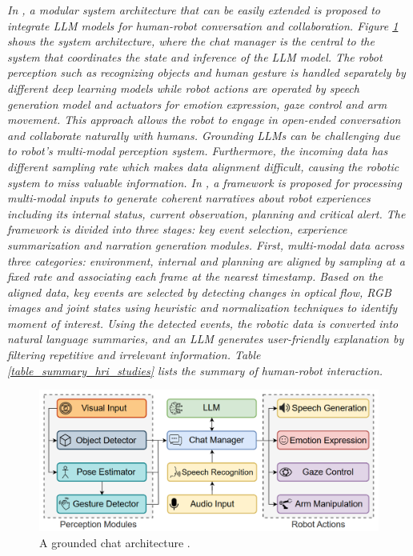 \documentclass[preprint,12pt]{elsarticle}
\begin{document}
\emph{In \citep{allgeuer_when_2024}, a modular system architecture that can be easily extended is proposed to integrate LLM models for human-robot conversation and collaboration. Figure \ref{fig_grounded_chat_architecture} shows the system architecture, where the chat manager is the central to the system that coordinates the state and inference of the LLM model.  The robot perception such as recognizing objects and human gesture is handled separately by different deep learning models while robot actions are operated by speech generation model and actuators for emotion expression, gaze control and arm movement. This approach allows the robot to engage in open-ended conversation and collaborate naturally with humans. Grounding LLMs can be challenging due to robot's multi-modal perception system. Furthermore, the incoming data has different sampling rate which makes data alignment difficult, causing the robotic system to miss valuable information. In \citep{wang_i_2024}, a framework is proposed for processing multi-modal inputs to generate coherent narratives about robot experiences including its internal status, current observation, planning and critical alert. The framework is divided into three stages: key event selection, experience summarization and narration generation modules. First, multi-modal data across three categories: environment, internal and planning are aligned by sampling at a fixed rate and associating each frame at the nearest timestamp. Based on the aligned data, key events are selected by detecting changes in optical flow, RGB images and joint states using heuristic and normalization techniques to identify moment of interest. Using the detected events, the robotic data is converted into natural language summaries, and an LLM generates user-friendly explanation by filtering repetitive and irrelevant information. Table \ref{table_summary_hri_studies} lists the summary of human-robot interaction.}

\begin{figure}[h!]
    \centering
    \includegraphics[scale=0.6]{fig_hri_llm_grounding_architecture.png}
    \caption{A grounded chat architecture \citep{allgeuer_when_2024}.}
    \label{fig_grounded_chat_architecture}
\end{figure}
\end{document}

